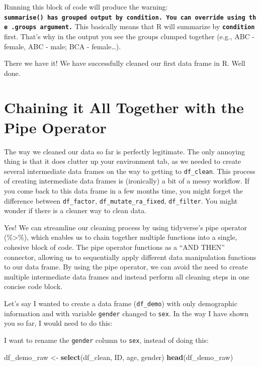 \documentclass[
]{book}
\newenvironment{Shaded}{\begin{snugshade}}{\end{snugshade}}
\newcommand{\FunctionTok}[1]{\textcolor[rgb]{0.13,0.29,0.53}{\textbf{#1}}}
\newcommand{\NormalTok}[1]{#1}
\newcommand{\OtherTok}[1]{\textcolor[rgb]{0.56,0.35,0.01}{#1}}
\begin{document}
Running this block of code will produce the warning: \textbf{\texttt{summarise()\ has\ grouped\ output\ by\ \textquotesingle{}condition\textquotesingle{}.\ You\ can\ override\ using\ the\ .groups\ argument.}} This basically means that R will summarize by \textbf{\texttt{condition}} first. That's why in the output you see the groups clumped together (e.g., ABC - female, ABC - male; BCA - female\ldots).

There we have it! We have successfully cleaned our first data frame in R. Well done.

\section{Chaining it All Together with the Pipe Operator}\label{chaining-it-all-together-with-the-pipe-operator}

The way we cleaned our data so far is perfectly legitimate. The only annoying thing is that it does clutter up your environment tab, as we needed to create several intermediate data frames on the way to getting to \texttt{df\_clean}. This process of creating intermediate data frames is (ironically) a bit of a messy workflow. If you come back to this data frame in a few months time, you might forget the difference between \texttt{df\_factor}, \texttt{df\_mutate\_ra\_fixed}, \texttt{df\_filter}. You might wonder if there is a cleaner way to clean data.

Yes! We can streamline our cleaning process by using tidyverse's pipe operator (\%\textgreater\%), which enables us to chain together multiple functions into a single, cohesive block of code. The pipe operator functions as a ``AND THEN'' connector, allowing us to sequentially apply different data manipulation functions to our data frame. By using the pipe operator, we can avoid the need to create multiple intermediate data frames and instead perform all cleaning steps in one concise code block.

Let's say I wanted to create a data frame (\texttt{df\_demo}) with only demographic information and with variable \texttt{gender} changed to \texttt{sex}. In the way I have shown you so far, I would need to do this:

I want to rename the \texttt{gender} column to \texttt{sex}, instead of doing this:

\begin{Shaded}
\begin{Highlighting}[]
\NormalTok{df\_demo\_raw }\OtherTok{\textless{}{-}} \FunctionTok{select}\NormalTok{(df\_clean, ID, age, gender)}
\FunctionTok{head}\NormalTok{(df\_demo\_raw)}
\end{Highlighting}
\end{Shaded}
\end{document}
